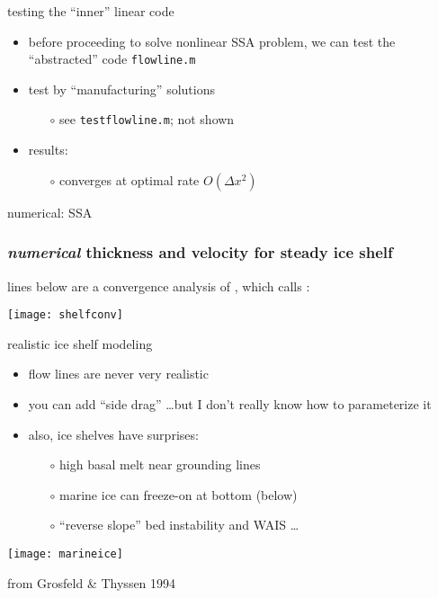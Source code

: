 \begin{frame}{testing the ``inner'' linear code}

\begin{itemize}
\item before proceeding to solve nonlinear SSA problem, we can test the ``abstracted'' code \texttt{flowline.m}
\item test by ``manufacturing'' solutions
  \begin{itemize}
  \item[$\circ$] see \texttt{testflowline.m}; not shown
  \end{itemize}
\item results:
  \begin{itemize}
  \item[$\circ$] converges at optimal rate $O(\Delta x^2)$
  \end{itemize}
\end{itemize}
\end{frame}


\begin{frame}{numerical: SSA}

\end{frame}


\begin{frame}[fragile]
  \frametitle{\emph{numerical} thickness and velocity for steady ice shelf}

lines below are a convergence analysis of , which calls :

\begin{center}
  \texttt{[image: shelfconv]}
\end{center}
\end{frame}


\begin{frame}{realistic ice shelf modeling}

\begin{itemize}
\item flow lines are never very realistic
\item you can add ``side drag'' \dots but I don't really know how to parameterize it
\item also, ice shelves have surprises:
  \begin{itemize}
  \item[$\circ$] high basal melt near grounding lines
  \item[$\circ$] marine ice can freeze-on at bottom (below)
  \item[$\circ$] ``reverse slope'' bed instability and WAIS \dots
  \end{itemize}
\end{itemize}

\medskip
\begin{center}
  \texttt{[image: marineice]}
  
  \medskip
  \tiny from Grosfeld \& Thyssen 1994 \nocite{GrosfeldThyssen1994}
\end{center}
\end{frame}


